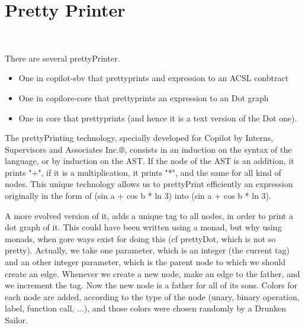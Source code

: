 \section{Pretty Printer}~\label{sec:pretty}


There are several prettyPrinter.
\begin{itemize}
	\item One in copilot-sbv that prettyprints and expression to an ACSL conbtract
	\item One in copilore-core that prettyprints an expression to an Dot graph
	\item One in core that prettyprints (and hence it is a text version of the Dot one).
\end{itemize}

The prettyPrinting technology, specially developed for Copilot by Interns, Supervisors and Associates Inc.$\circledR$, consists in an induction on the syntax of the language, or by induction on the AST. If the node of the AST is an addition, it prints "+", if it is a multiplication, it prints "*", and the same for all kind of nodes. This unique technology allows us to prettyPrint efficiently an expression originally in the form of (sin a + cos b * ln 3) into (sin a + cos b * ln 3).

A more evolved version of it, adds a unique tag to all nodes, in order to print a dot graph of it. This could have been written using a monad, but why using monads, when gore ways exist for doing this (cf prettyDot, which is not so pretty). Actually, we take one parameter, which is an integer (the current tag) and an other integer parameter, which is the parent node to which we should create an edge. Whenever we create a new node, make an edge to the father, and we increment the tag. Now the new node is a father for all of its sons. Colors for each node are added, according to the type of the node (unary, binary operation, label, function call, ...), and those colors were chosen randomly by a Drunken Sailor. 